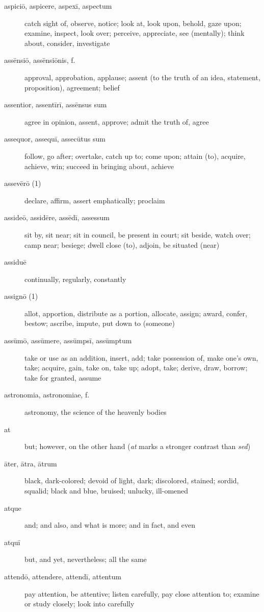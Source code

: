 \begin{description}
    \item[aspiciō, aspicere, aspexī, aspectum] \marginnote{*}catch sight of, observe, notice; look at, look upon, behold, gaze upon; examine, inspect, look over; perceive, appreciate, see (mentally); think about, consider, investigate
    \item[assēnsiō, assēnsiōnis, f.] approval, approbation, applause; assent (to the truth of an idea, statement, proposition), agreement; belief
    \item[assentior, assentīrī, assēnsus sum] agree in opinion, assent, approve; admit the truth of, agree
    \item[assequor, assequī, assecūtus sum] follow, go after; overtake, catch up to; come upon; attain (to), acquire, achieve, win; succeed in bringing about, achieve
    \item[assevērō (1)] declare, affirm, assert emphatically; proclaim
    \item[assideō, assidēre, assēdī, assessum] sit by, sit near; sit in council, be present in court; sit beside, watch over; camp near; besiege; dwell close (to), adjoin, be situated (near)
    \item[assiduē] continually, regularly, constantly
    \item[assignō (1)] allot, apportion, distribute as a portion, allocate, assign; award, confer, bestow; ascribe, impute, put down to (someone)
    \item[assūmō, assūmere, assūmpsī, assūmptum] take or use as an addition, insert, add; take possession of, make one's own, take; acquire, gain, take on, take up; adopt, take; derive, draw, borrow; take for granted, assume
    \item[astronomia, astronomiae, f.] astronomy, the science of the heavenly bodies
    \item[at] \marginnote{*}but; however, on the other hand (\textit{at} marks a stronger contrast than \textit{sed})
    \item[āter, ātra, ātrum] black, dark-colored; devoid of light, dark; discolored, stained; sordid, squalid; black and blue, bruised; unlucky, ill-omened
    \item[atque] \marginnote{*}and; and also, and what is more; and in fact, and even
    \item[atquī] but, and yet, nevertheless; all the same
    \item[attendō, attendere, attendī, attentum] pay attention, be attentive; listen carefully, pay close attention to; examine or study closely; look into carefully

\end{description}
